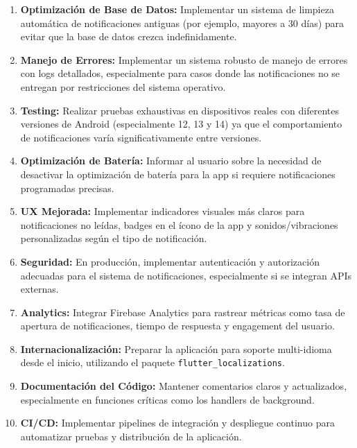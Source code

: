 \documentclass[12pt,a4paper]{article}
\begin{document}
\begin{enumerate}
    \item \textbf{Optimización de Base de Datos:} Implementar un sistema de limpieza automática de notificaciones antiguas (por ejemplo, mayores a 30 días) para evitar que la base de datos crezca indefinidamente.

    \item \textbf{Manejo de Errores:} Implementar un sistema robusto de manejo de errores con logs detallados, especialmente para casos donde las notificaciones no se entregan por restricciones del sistema operativo.

    \item \textbf{Testing:} Realizar pruebas exhaustivas en dispositivos reales con diferentes versiones de Android (especialmente 12, 13 y 14) ya que el comportamiento de notificaciones varía significativamente entre versiones.

    \item \textbf{Optimización de Batería:} Informar al usuario sobre la necesidad de desactivar la optimización de batería para la app si requiere notificaciones programadas precisas.

    \item \textbf{UX Mejorada:} Implementar indicadores visuales más claros para notificaciones no leídas, badges en el ícono de la app y sonidos/vibraciones personalizadas según el tipo de notificación.

    \item \textbf{Seguridad:} En producción, implementar autenticación y autorización adecuadas para el sistema de notificaciones, especialmente si se integran APIs externas.

    \item \textbf{Analytics:} Integrar Firebase Analytics para rastrear métricas como tasa de apertura de notificaciones, tiempo de respuesta y engagement del usuario.

    \item \textbf{Internacionalización:} Preparar la aplicación para soporte multi-idioma desde el inicio, utilizando el paquete \texttt{flutter\_localizations}.

    \item \textbf{Documentación del Código:} Mantener comentarios claros y actualizados, especialmente en funciones críticas como los handlers de background.

    \item \textbf{CI/CD:} Implementar pipelines de integración y despliegue continuo para automatizar pruebas y distribución de la aplicación.
\end{enumerate}
\end{document}
